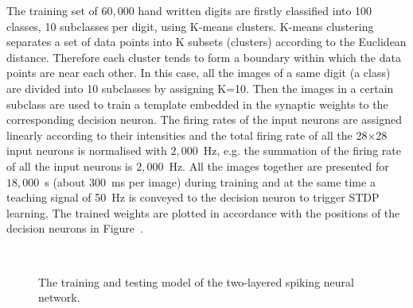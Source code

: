 \documentclass{frontiersENG} %
\begin{document}
The training set of $60,000$ hand written digits are firstly classified into 100 classes, 10 subclasses per digit, using K-means clusters.
K-means clustering separates a set of data points into K subsets (clusters) according to the Euclidean distance.
Therefore each cluster tends to form a boundary within which the data points are near each other.
In this case, all the images of a same digit (a class) are divided into 10 subclasses by assigning K=10.
Then the images in a certain subclass are used to train a template embedded in the synaptic weights to the corresponding decision neuron.
The firing rates of the input neurons are assigned linearly according to their intensities and the total firing rate of all the 28$\times$28 input neurons is normalised with $2,000$~Hz, e.g. the summation of the firing rate of all the input neurons is $2,000$~Hz.
All the images together are presented for $18,000$~s (about 300~ms per image) during training and at the same time a teaching signal of 50~Hz is conveyed to the decision neuron to trigger STDP learning.
The trained weights are plotted in accordance with the positions of the decision neurons in Figure~.
\begin{figure}[thb!]
	\centering
	 \\
	
	\centering
	
	
	\caption{The training and testing model of the two-layered spiking neural network.}
	\label{fig:model}
\end{figure} 
\end{document}
